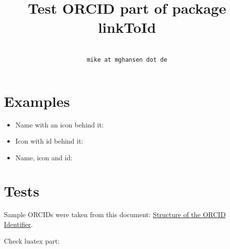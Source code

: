 \documentclass{article}
\newcounter{testsFailed}
\newcounter{testsPassed}
\begin{document}
\title{Test ORCID part of package \textsf{linkToId}}
\author{ \\ \texttt{mike at mghansen dot de}}
\maketitle
\thispagestyle{fancy}

\section{Examples}

\begin{itemize}
\item Name with an icon behind it: 

\item Icon with id behind it: 

\item Name, icon and id: 
\end{itemize}

\section{Tests}

Sample ORCIDs were taken from this document: \href{https://support.orcid.org/knowledgebase/articles/116780-structure-of-the-orcid-identifier}{Structure of the ORCID Identifier}.

\ifLinkToIdUseLua

Check luatex part:

\newcommand{\checkValidORCID}[1]{Verify valid ORCID "#1": \ifodd\directlua{linkToId.checkORCIDWrapperBool("#1");} Checksum reported as false!\stepcounter{testsFailed}\else Passed!\stepcounter{testsPassed}\fi}
\newcommand{\checkInvalidORCID}[2]{Detect invalid ORCID "#1" (#2): \ifodd\directlua{linkToId.checkORCIDWrapperBool("#1");} Ok, error detected.\stepcounter{testsPassed}\else \stepcounter{testsFailed}Defect not found!\fi}
\end{document}
